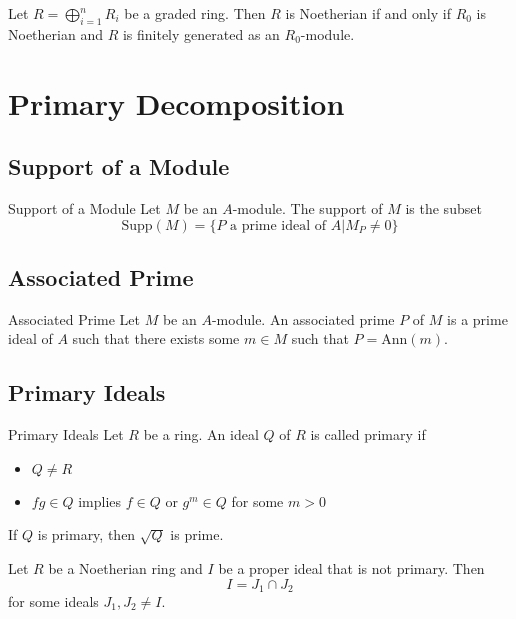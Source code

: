 \documentclass[a4paper]{article}
\begin{document}
\begin{thm}{}{} Let $R=\bigoplus_{i=1}^nR_i$ be a graded ring. Then $R$ is Noetherian if and only if $R_0$ is Noetherian and $R$ is finitely generated as an $R_0$-module. 
\end{thm}

\pagebreak
\section{Primary Decomposition}
\subsection{Support of a Module}
\begin{defn}{Support of a Module}{} Let $M$ be an $A$-module. The support of $M$ is the subset $$\text{Supp}(M)=\{P\text{ a prime ideal of }A|M_P\neq 0\}$$
\end{defn}

\subsection{Associated Prime}
\begin{defn}{Associated Prime}{} Let $M$ be an $A$-module. An associated prime $P$ of $M$ is a prime ideal of $A$ such that there exists some $m\in M$ such that $P=\text{Ann}(m)$. 
\end{defn}

\subsection{Primary Ideals}
\begin{defn}{Primary Ideals}{} Let $R$ be a ring. An ideal $Q$ of $R$ is called primary if
\begin{itemize}
\item $Q\neq R$
\item $fg\in Q$ implies $f\in Q$ or $g^m\in Q$ for some $m>0$
\end{itemize}
\end{defn}

\begin{lmm}{}{} If $Q$ is primary, then $\sqrt{Q}$ is prime. 
\end{lmm}

\begin{lmm}{}{} Let $R$ be a Noetherian ring and $I$ be a proper ideal that is not primary. Then $$I=J_1\cap J_2$$ for some ideals $J_1,J_2\neq I$. 
\end{lmm}
\end{document}
